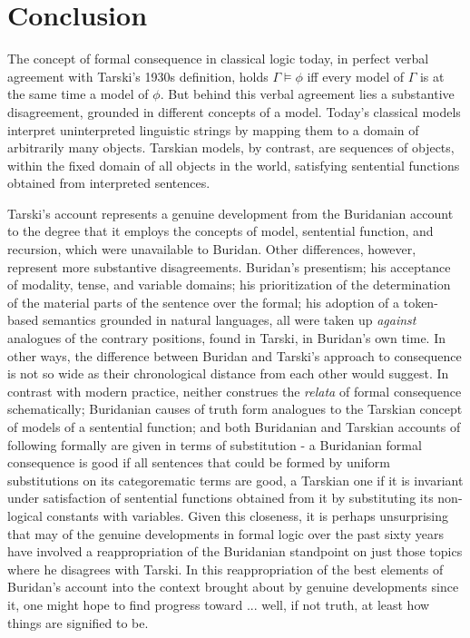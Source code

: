 \documentclass[]{article}
\begin{document}
\section{Conclusion}
The concept of formal consequence in classical logic today, in perfect verbal agreement with Tarski's 1930s definition, holds $\Gamma \models \phi$ iff every model of $\Gamma$ is at the same time a model of $\phi$. But behind this verbal agreement lies a substantive disagreement, grounded in different concepts of a model. Today's classical models interpret uninterpreted linguistic strings by mapping them to a domain of arbitrarily many objects. Tarskian models, by contrast, are sequences of objects, within the fixed domain of all objects in the world, satisfying sentential functions obtained from interpreted sentences.

Tarski's account represents a genuine development from the Buridanian account to the degree that it employs the concepts of model, sentential function, and recursion, which were unavailable to Buridan. Other differences, however, represent more substantive disagreements. Buridan's presentism; his acceptance of modality, tense, and variable domains; his prioritization of the determination of the material parts of the sentence over the formal; his adoption of a token-based semantics grounded in natural languages, all were taken up \textit{against} analogues of the contrary positions, found in Tarski, in Buridan's own time. In other ways, the difference between Buridan and Tarski's approach to consequence is not so wide as their chronological distance from each other would suggest. In contrast with modern practice, neither construes the \textit{relata} of formal consequence schematically; Buridanian causes of truth form analogues to the Tarskian concept of models of a sentential function; and both Buridanian and Tarskian accounts of following formally are given in terms of substitution - a Buridanian formal consequence is good if all sentences that could be formed by uniform substitutions on its categorematic terms are good, a Tarskian one if it is invariant under satisfaction of sentential functions obtained from it by substituting its non-logical constants with variables. Given this closeness, it is perhaps unsurprising that may of the genuine developments in formal logic over the past sixty years have involved a reappropriation of the Buridanian standpoint on just those topics where he disagrees with Tarski. In this reappropriation of the best elements of Buridan's account into the context brought about by genuine developments since it, one might hope to find progress toward ... well, if not truth, at least how things are signified to be.
\printbibliography
\end{document}
